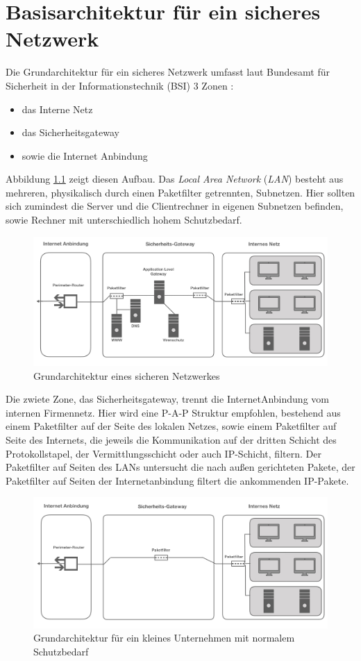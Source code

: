 \chapter{Basisarchitektur für ein sicheres Netzwerk}
Die Grundarchitektur für ein sicheres Netzwerk umfasst laut Bundesamt für Sicherheit in der Informationstechnik (BSI) 3 Zonen \cite{isi-lana}: 
\begin{itemize}
	\item das Interne Netz 
	\item das Sicherheitsgateway
	\item sowie die Internet Anbindung	
\end{itemize}
Abbildung \ref{grundarch} zeigt diesen Aufbau. Das \emph{Local Area Network} (\emph{LAN}) besteht aus mehreren, physikalisch durch einen Paketfilter getrennten, Subnetzen. Hier sollten sich zumindest die Server und die Clientrechner in eigenen Subnetzen befinden, sowie Rechner mit unterschiedlich hohem Schutzbedarf. 

\begin{figure}
	\includegraphics[width=\linewidth]{grundarchitektur}
	\caption{Grundarchitektur eines sicheren Netzwerkes}
	\label{grundarch}
\end{figure}

Die zwiete Zone, das Sicherheitsgateway, trennt die InternetAnbindung vom internen Firmennetz. Hier wird eine P-A-P Struktur empfohlen, bestehend aus einem Paketfilter auf der Seite des lokalen Netzes, sowie einem Paketfilter auf Seite des Internets, die jeweils die Kommunikation auf der dritten Schicht des Protokollstapel, der Vermittlungsschicht oder auch IP-Schicht, filtern. Der Paketfilter auf Seiten des LANs untersucht die nach außen gerichteten Pakete, der Paketfilter auf Seiten der Internetanbindung filtert die ankommenden IP-Pakete.

\begin{figure}
	\includegraphics[width=\linewidth]{klUnternHoch.jpeg}
	\caption{Grundarchitektur für ein kleines Unternehmen mit normalem Schutzbedarf}
	\label{klUnorm}
\end{figure}

